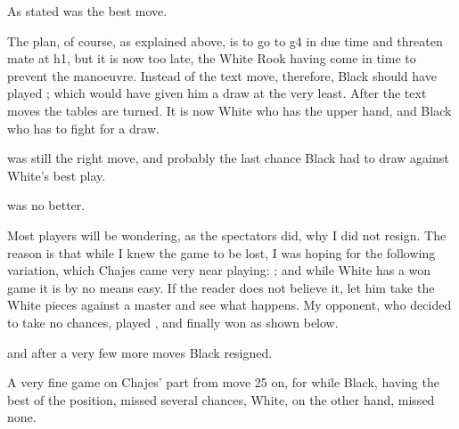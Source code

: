 \documentclass[10pt,twoside]{article}
\begin{document}

As stated  was the best move.


The plan, of course, as explained above, is to go to g4 in due time and threaten mate at h1, but it is now too late, the White Rook having come in time to prevent the manoeuvre. Instead of the text move, therefore, Black should have played ; which would have given him a draw at the very least. After the text moves the tables are turned. It is now White who has the upper hand, and Black who has to fight for a draw.


 was still the right move, and probably the last chance Black had to draw against White's best play.


 was no better.


Most players will be wondering, as the spectators did, why I did not resign. The reason is that while I knew the game to be lost, I was hoping for the following variation, which Chajes came very near playing: ; and while White has a won game it is by no means easy. If the reader does not believe it, let him take the White pieces against a master and see what happens. My opponent, who decided to take no chances, played , and finally won as shown below.


and after a very few more moves Black resigned.

A very fine game on Chajes' part from move 25 on, for while Black, having the best of the position, missed several chances, White, on the other hand, missed none.
\end{document}
